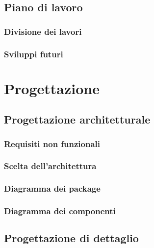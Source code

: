 \documentclass{article}
\begin{document}
\subsection{Piano di lavoro}
\subsubsection{Divisione dei lavori}

\subsubsection{Sviluppi futuri}



\pagebreak
\section{Progettazione}

\subsection{Progettazione architetturale}
\subsubsection{Requisiti non funzionali}

\subsubsection{Scelta dell'architettura}

\subsubsection{Diagramma dei package}

\subsubsection{Diagramma dei componenti}


\subsection{Progettazione di dettaglio}
\end{document}
